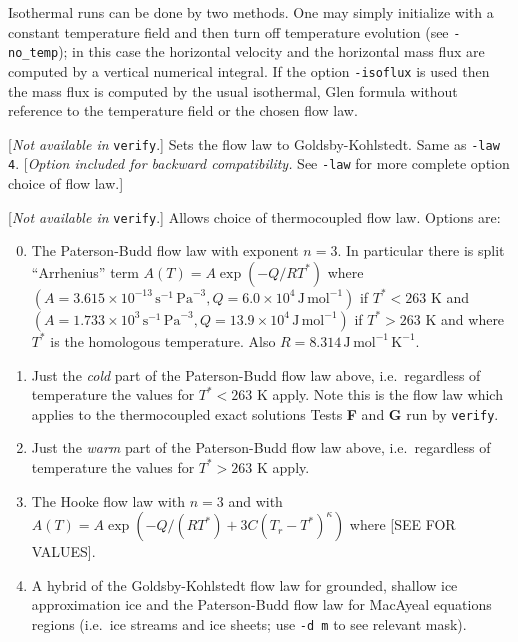 \documentclass[11pt,final]{amsart}
\begin{document}
  Isothermal runs can be done by two methods.  One may simply initialize with a constant temperature field and then turn off temperature evolution (see \verb|-no_temp|); in this case the horizontal velocity and the horizontal mass flux are computed by a vertical numerical integral.  If the option \verb|-isoflux| is used then the mass flux is computed by the usual isothermal, Glen formula without reference to the temperature field or the chosen flow law.

  [\emph{Not available in } \verb|verify|.]  Sets the flow law to Goldsby-Kohlstedt.  Same as \verb|-law 4|.  [\emph{Option included for backward compatibility.}  See \verb|-law| for more complete option choice of flow law.]



  [\emph{Not available in } \verb|verify|.]  Allows choice of thermocoupled flow law.  Options are:\renewcommand{\labelenumi}{\arabic{enumi}:~}\begin{enumerate}\setcounter{enumi}{-1}
\item The Paterson-Budd \cite{PatersonBudd} flow law with exponent $n=3$.  In particular there is split ``Arrhenius'' term $A(T) = A \exp(-Q/RT^*)$ where $(A = 3.615 \times 10^{-13}\, \text{s}^{-1}\, \text{Pa}^{-3}, Q = 6.0 \times 10^4\, \text{J}\, \text{mol}^{-1})$ if $T^* < 263$ K and $(A = 1.733 \times 10^{3}\, \text{s}^{-1}\, \text{Pa}^{-3}, Q = 13.9 \times 10^4\, \text{J}\, \text{mol}^{-1})$ if $T^* > 263$ K and where $T^*$ is the homologous temperature.  Also $R=8.314\, \text{J}\, \text{mol}^{-1}\, \text{K}^{-1}$.
\item Just the \emph{cold} part of the Paterson-Budd flow law above, i.e.~regardless of temperature the values for $T^*<263$ K apply.  Note this is the flow law which applies to the thermocoupled exact solutions Tests \textbf{F} and \textbf{G} run by \verb|verify|.
\item Just the \emph{warm} part of the Paterson-Budd flow law above, i.e.~regardless of temperature the values for $T^*>263$ K apply.
\item The Hooke flow law with $n=3$ and with $A(T) = A \exp(-Q/(RT^*) + 3C (T_r - T^*)^\kappa)$ where [SEE \cite{Hooke,PayneBaldwin} FOR VALUES].
\item A hybrid of the Goldsby-Kohlstedt flow law \cite{GoldsbyKohlstedt} for grounded, shallow ice approximation ice and the Paterson-Budd flow law for MacAyeal equations regions (i.e.~ice streams and ice sheets; use \verb|-d m| to see relevant mask).
\end{enumerate}
\end{document}
